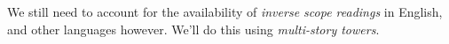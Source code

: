 \documentclass[nols,twoside,nofonts,nobib,nohyper]{tufte-handout}
\begin{document}
We still need to account for the availability of \textit{inverse scope readings}
in English, and other languages however. We'll do this using \textit{multi-story
towers}.













\end{document}
